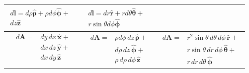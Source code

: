\documentclass[letterpaper,landscape,10pt]{article}
\begin{document}
{\begin{multicols}{3}
\begin{center}
\begin{tabular}{ @{}c@{} !{\color{black}\vline} c !{\color{black}\vline} @{}c@{} }
			\parbox[t]{.295\columnwidth}{\vspace{-10pt}
				\begin{equation*}\begin{split}
					d\bm{\bm{l}} = d\rho\bm{\hat{\rho}} +
						\rho d\phi\bm{\hat{\phi}} +& \\
						dz\bm{\hat{z}}
				\end{split}\end{equation*} } &

			\parbox[t]{.335\columnwidth}{\vspace{-10pt}
				\begin{equation*}\begin{split}
					d\bm{\bm{l}} = dr\bm{\hat{r}} +
						rd\theta\bm{\hat{\theta}} + & \\
						r\sin\theta d\phi\bm{\hat{\phi}}
				\end{split}\end{equation*} } \\

			\hline

			\parbox[t]{.290\columnwidth}{\vspace{-10pt}
				\begin{equation*}\begin{split}
					d\bm{\bm{A}} =& dy\, dx\, \bm{\hat{x}} + \\
						&dx\, dz\, \bm{\hat{y}} + \\
						&dx\, dy\, \bm{\hat{z}}
				\end{split}\end{equation*} } &

			\parbox[t]{.295\columnwidth}{\vspace{-10pt}
				\begin{equation*}\begin{split}
					d\bm{\bm{A}} =& \rho d\phi\, dz\, \bm{\hat{\rho}} + \\
						&d\rho\, dz\, \bm{\hat{\phi}} + \\
						&\rho\, d\rho\, d\phi\, \bm{\hat{z}}
				\end{split}\end{equation*} } &

			\parbox[t]{.335\columnwidth}{\vspace{-10pt}
				\begin{equation*}\begin{split}
					d\bm{\bm{A}} =& r^2\sin\theta \, d\theta \, d\phi \,
							\bm{\hat{r}} + \\
						&r\sin\theta\, dr \, d\phi \, \bm{\hat{\theta}} + \\
						& r \, dr \, d\theta \, \bm{\hat{\phi}}
				\end{split}\end{equation*} } \\


\end{tabular}
\end{center}
\end{multicols}}
\end{document}
